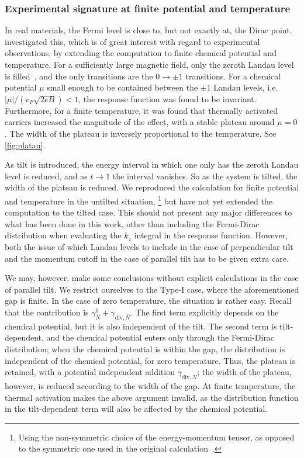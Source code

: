 \subsubsection{Experimental signature at finite potential and temperature}
In real materials, the Fermi level is close to, but not exactly at, the Dirac point.
~\textcite{arjonaFingerprintsConformalAnomaly2019} investigated this, which is of great interest with regard to experimental observations, by extending the computation to finite chemical potential and temperature.
For a sufficiently large magnetic field, only the zeroth Landau level is filled~\cite{arjonaFingerprintsConformalAnomaly2019,vozmedianoTheoreticalPhysicsColloquium2021}, and the only transitions are the \( 0 \to \pm 1 \) transitions.
For a chemical potential \( \mu \) small enough to be contained between the \( \pm 1 \) Landau levels, i.e. \( |\mu| /(v_F \sqrt{2eB} ) < 1 \), the response function was found to be invariant.
Furthermore, for a finite temperature, it was found that thermally activated carriers increased the magnitude of the effect, with a stable plateau around \( \mu = 0 \).
The width of the plateau is inversely proportional to the temperature.
See \cref{fig:platau}.

As tilt is introduced, the energy interval in which one only has the zeroth Landau level is reduced, and as \( t \to 1 \) the interval vanishes.
So as the system is tilted, the width of the plateau is reduced.
We reproduced the calculation for finite potential and temperature in the untilted situation,%
\footnote{Using the non-symmetric choice of the energy-momentum tensor, as opposed to the symmetric one used in the original calculation~\cite{arjonaFingerprintsConformalAnomaly2019}.}
but have not yet extended the computation to the tilted case.
This should not present any major differences to what has been done in this work, other than including the Fermi-Dirac distribution when evaluating the \( k_z \) integral in the response function.
However, both the issue of which Landau levels to include in the case of perpendicular tilt and the momentum cutoff in the case of parallel tilt has to be given extra care.

We may, however, make some conclusions without explicit calculations in the case of parallel tilt.
We restrict ourselves to the Type-I case, where the aforementioned gap is finite.
In the case of zero temperature, the situation is rather easy.
Recall that the contribution is \( \gamma^0_{\bar{N}} + \gamma_{\text{div}, \bar{N}} \).
The first term explicitly depends on the chemical potential, but it is also independent of the tilt.
The second term is tilt-dependent, and the chemical potential enters only through the Fermi-Dirac distribution;
when the chemical potential is within the gap, the distribution is independent of the chemical potential, for zero temperature.
Thus, the plateau is retained, with a potential independent addition \( \gamma_{\text{div},N} \);
the width of the plateau, however, is reduced according to the width of the gap.
At finite temperature, the thermal activation makes the above argument invalid, as the distribution function in the tilt-dependent term will also be affected by the chemical potential.

